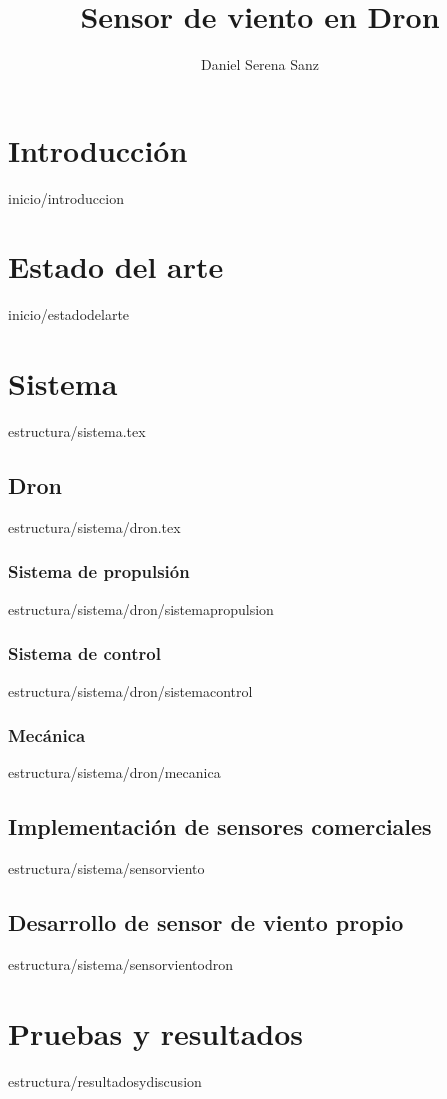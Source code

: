 \documentclass[epsbased,lof,loe,loc,copyright,final,printable,extendedindex,firstnumbered,tfg,gnuplot]{tfgtfmthesisuam}
\title{Sensor de viento en Dron}
\author{Daniel Serena Sanz}
\begin{document}
\chapter{Introducción\label{CAP:INTRODUCCION}}{inicio/introduccion}
\chapter{Estado del arte\label{CAP:ESTADODELARTE}}{inicio/estadodelarte}
\chapter{Sistema\label{CAP:SISTEMA}}{estructura/sistema.tex}

	\section{Dron\label{SEC:DRON}}{estructura/sistema/dron.tex}
		\subsection{Sistema de propulsión\label{SS:SISTPROPULSION}}{estructura/sistema/dron/sistemapropulsion}
		\subsection{Sistema de control\label{SS:SISTCONTROL}}{estructura/sistema/dron/sistemacontrol}
		\subsection{Mecánica\label{SS:MECANICA}}{estructura/sistema/dron/mecanica}
		
	\section{Implementación de sensores comerciales\label{SEC:SENSORVIENTO}}{estructura/sistema/sensorviento}
	
	\section{Desarrollo de sensor de viento propio\label{SEC:SENSORVIENTODRON}}{estructura/sistema/sensorvientodron}

\chapter{Pruebas y resultados\label{CAP:RESEXPYDISC}}{estructura/resultadosydiscusion}
\end{document}
